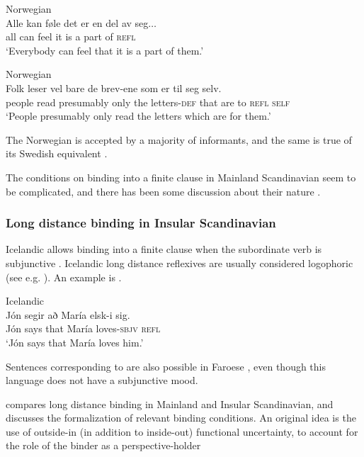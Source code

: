 \documentclass[output=paper,hidelinks]{langscibook}
\begin{document}
\ea\label{ex:Scandinavian:116} Norwegian \citep[116]{Lodrup09}\\
\gll
 {Alle} {kan} {føle} {det} {er} {en} {del} {av} {seg}$\ldots$\\
 {all} {can} {feel} {it} {is} a {part} {of} \textsc{refl}\\
\glt `Everybody can feel that it is a part of them.'\z

\ea\label{ex:Scandinavian:117} Norwegian \citep{Lundquist14c}\\
\gll
 {Folk} {leser} {vel} {bare} {de} {brev-ene} {som} {er} {til} {seg} {selv.}\\
 people read presumably only the letters-\textsc{def} that are to \textsc{refl} \textsc{self}\\
 \glt `People presumably only read the letters which are for them.'\z

 \noindent The Norwegian  is accepted by a majority of informants, and the same is true of its Swedish equivalent \citep{Lundquist14c}.

 The conditions on binding into a finite clause in Mainland
 Scandinavian seem to be complicated, and there has been some
 discussion about their nature \citep{Strahan:LFG09,Strahan11,Lodrup09b,Lundquist14c,Lundquist14d,Julien20}.

\subsubsection{Long distance binding in Insular Scandinavian}

Icelandic allows binding into a finite clause when the subordinate verb is subjunctive \citep{Thrainsson76}. Icelandic long distance reflexives are usually considered logophoric (see e.g. \citealt{Maling84}). An example is .



\ea\label{ex:Scandinavian:118} Icelandic \citep{Thrainsson76}\\
\gll
 {Jón} {segir} {að} {María} {elsk-i} {sig.}\\
 Jón says that María loves-\textsc{sbjv} \textsc{refl}\\
\glt `Jón says that María loves him.'\z

\noindent Sentences corresponding to  are also possible in Faroese \citep{Strahan11}, even though this language does not have a subjunctive mood.

\citet{Strahan:LFG09,Strahan11}  compares long distance binding in Mainland and Insular Scandinavian, and discusses the formalization of relevant binding conditions. An original idea is the use of outside-in (in addition to inside-out) functional uncertainty, to account for the role of the binder as a perspective-holder
\end{document}
